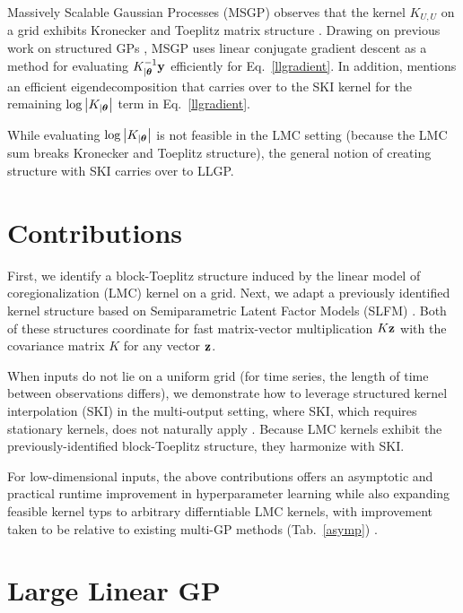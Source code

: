 \documentclass{article}
\begin{document}
Massively Scalable Gaussian Processes (MSGP) observes that the kernel $K_{U,U}$ on a grid exhibits Kronecker and Toeplitz matrix structure \cite{msgp}. Drawing on previous work on structured GPs \cite{cunningham2008fast, gilboa2015scaling}, MSGP uses linear conjugate gradient descent as a method for evaluating $K_{|{\boldsymbol\theta}}^{-1}\textbf{y}$ efficiently for Eq.~\ref{llgradient}. In addition, \cite{wilson2014fast} mentions an efficient eigendecomposition that carries over to the SKI kernel for the remaining $\log\left|K_{|{\boldsymbol\theta}}\right|$ term in Eq.~\ref{llgradient}.

While evaluating $\log\left|K_{|{\boldsymbol\theta}}\right|$ is not feasible in the LMC setting (because the LMC sum breaks Kronecker and Toeplitz structure), the general notion of creating structure with SKI carries over to LLGP.

\section{Contributions}\label{sec:contributions}


First, we identify a block-Toeplitz structure induced by the linear model of coregionalization (LMC) kernel on a grid. Next, we adapt a previously identified kernel structure based on Semiparametric Latent Factor Models (SLFM) \cite{seeger2005semiparametric}. Both of these structures coordinate for fast matrix-vector multiplication $K\textbf{z}$ with the covariance matrix $K$ for any vector $\textbf{z}$.

When inputs do not lie on a uniform grid (for time series, the length of time between observations differs), we demonstrate how to leverage structured kernel interpolation (SKI) in the multi-output setting, where SKI, which requires stationary kernels, does not naturally apply \cite{kiss-gp}. Because LMC kernels exhibit the previously-identified block-Toeplitz structure, they harmonize with SKI.

For low-dimensional inputs, the above contributions offers an asymptotic and practical runtime improvement in hyperparameter learning while also expanding feasible kernel typs to arbitrary differntiable LMC kernels, with improvement taken to be relative to existing multi-GP methods (Tab.~\ref{asymp}) \cite{nguyen2014collaborative}.

\section{Large Linear GP} \label{sec:matrix-free}
\end{document}
